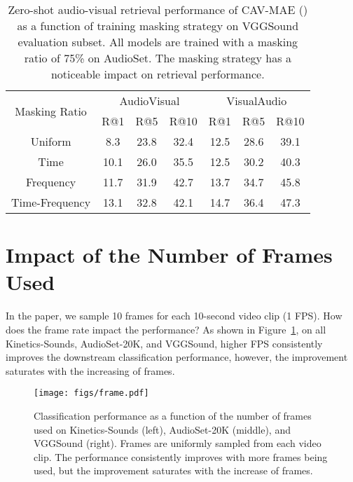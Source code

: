 \documentclass{article} \usepackage{iclr2023_conference,times}
\begin{document}
\begin{table}[]
\centering
\caption{Zero-shot audio-visual retrieval performance of CAV-MAE () as a function of training masking strategy on VGGSound evaluation subset. All models are trained with a masking ratio of 75\% on AudioSet. The masking strategy has a noticeable impact on retrieval performance.}
\label{tab:mask_method_retrieval}
\begin{tabular}{@{}ccccccc@{}}
\toprule
\multirow{2}{*}{Masking Ratio} & \multicolumn{3}{c}{AudioVisual} & \multicolumn{3}{c}{VisualAudio} \\ \cmidrule(l){2-7} 
                               & R@1            & R@5           & R@10          & R@1            & R@5           & R@10          \\ \midrule
Uniform                        & 8.3            & 23.8          & 32.4          & 12.5           & 28.6          & 39.1          \\
Time                           & 10.1           & 26.0          & 35.5          & 12.5           & 30.2          & 40.3          \\
Frequency                      & 11.7           & 31.9          & 42.7          & 13.7           & 34.7          & 45.8          \\
Time-Frequency                 & 13.1           & 32.8          & 42.1          & 14.7           & 36.4          & 47.3          \\ \bottomrule
\end{tabular}
\end{table}

\newpage

\section{Impact of the Number of Frames Used}
\label{sec:num_frame}

In the paper, we sample 10 frames for each 10-second video clip (1 FPS). How does the frame rate impact the performance? As shown in Figure~\ref{fig:frame_rate}, on all Kinetics-Sounds, AudioSet-20K, and VGGSound, higher FPS consistently improves the downstream classification performance, however, the improvement saturates with the increasing of frames.

\begin{figure}[h]
\centering
\texttt{[image: figs/frame.pdf]}
\caption{Classification performance as a function of the number of frames used on Kinetics-Sounds (left), AudioSet-20K (middle), and VGGSound (right). Frames are uniformly sampled from each video clip. The performance consistently improves with more frames being used, but the improvement saturates with the increase of frames.}
\label{fig:frame_rate}
\end{figure}
\end{document}
